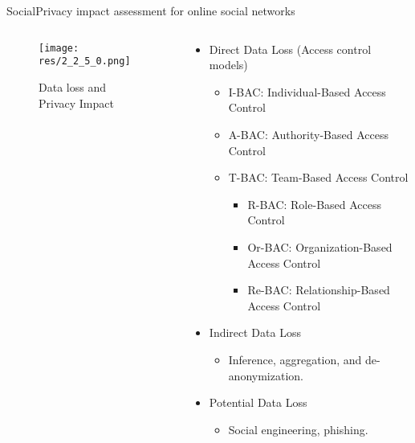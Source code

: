 \begin{frame}{Social}{Privacy impact assessment for online social networks \cite{wang_privacy_2015}}

	\begin{columns}
		\begin{column}{0.5\textwidth}
			\begin{center}
			
				\begin{figure}
					\texttt{[image: res/2\_2\_5\_0.png]}
					\caption{\label{fig:2_2_5_0} Data loss and Privacy Impact}
				\end{figure}
				
			\end{center}
		\end{column}
		
		\begin{column}{0.5\textwidth}
			
			\begin{itemize}
			
				\item Direct Data Loss (Access control models)
					\begin{itemize}
						\item I-BAC: Individual-Based Access Control
						\item A-BAC: Authority-Based Access Control
						
						\item T-BAC: Team-Based Access Control
							\begin{itemize}
								\item R-BAC: Role-Based Access Control
								\item Or-BAC: Organization-Based Access Control
								\item Re-BAC: Relationship-Based Access Control

							\end{itemize}
					\end{itemize}
					
				\item Indirect Data Loss
					\begin{itemize}
						\item Inference, aggregation, and de-anonymization.
					\end{itemize}
					
				\item Potential Data Loss
					\begin{itemize}
						\item Social engineering, phishing.
					\end{itemize}
					
			\end{itemize}
			
		\end{column}
	\end{columns}
	
\end{frame}


